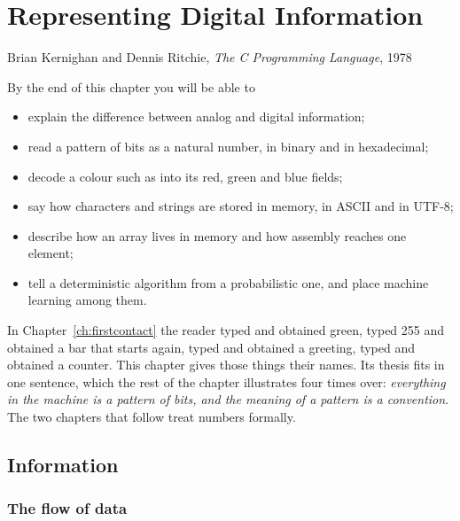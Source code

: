 \chapter{Representing Digital Information}
\label{ch:information}

  {Brian Kernighan and Dennis Ritchie, \emph{The C Programming Language}, 1978}

\begin{chapgoals}
By the end of this chapter you will be able to
\begin{itemize}
\item explain the difference between analog and digital information;
\item read a pattern of bits as a natural number, in binary and in hexadecimal;
\item decode a \prg colour such as  into its red, green and blue fields;
\item say how characters and strings are stored in memory, in ASCII and in UTF-8;
\item describe how an array lives in memory and how assembly reaches one element;
\item tell a deterministic algorithm from a probabilistic one, and place machine learning among them.
\end{itemize}
\end{chapgoals}


In Chapter~\ref{ch:firstcontact} the reader typed  and obtained
green, typed 255 and obtained a bar that starts again, typed  and
obtained a greeting, typed  and obtained a counter. This chapter
gives those things their names. Its thesis fits in one sentence, which the
rest of the chapter illustrates four times over: \emph{everything in the
machine is a pattern of bits, and the meaning of a pattern is a convention}.
The two chapters that follow treat numbers formally.

\section{Information}

\subsection{The flow of data}

